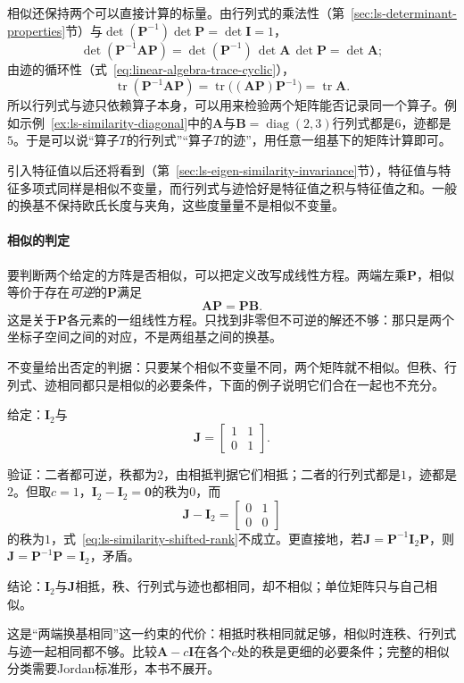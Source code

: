 相似还保持两个可以直接计算的标量。由行列式的乘法性（第~\ref{sec:ls-determinant-properties}节）与$\det(\bm P^{-1})\det\bm P=\det\bm I=1$，
\[
 \det(\bm P^{-1}\bm A\bm P)=\det(\bm P^{-1})\,\det\bm A\,\det\bm P=\det\bm A;
\]
由迹的循环性（式~\eqref{eq:linear-algebra-trace-cyclic}），
\[
 \operatorname{tr}(\bm P^{-1}\bm A\bm P)=\operatorname{tr}\bigl((\bm A\bm P)\bm P^{-1}\bigr)=\operatorname{tr}\bm A.
\]
所以行列式与迹只依赖算子本身，可以用来检验两个矩阵能否记录同一个算子。例如示例~\ref{ex:ls-similarity-diagonal}中的$\bm A$与$\bm B=\operatorname{diag}(2,3)$行列式都是$6$，迹都是$5$。于是可以说“算子$T$的行列式”“算子$T$的迹”，用任意一组基下的矩阵计算即可。

引入特征值以后还将看到（第~\ref{sec:ls-eigen-similarity-invariance}节），特征值与特征多项式同样是相似不变量，而行列式与迹恰好是特征值之积与特征值之和。一般的换基不保持欧氏长度与夹角，这些度量量不是相似不变量。

\paragraph{相似的判定}
\label{sec:ls-similarity-conditions}
要判断两个给定的方阵是否相似，可以把定义改写成线性方程。两端左乘$\bm P$，相似等价于存在\emph{可逆}的$\bm P$满足
\begin{equation}
 \bm A\bm P=\bm P\bm B.
 \label{eq:ls-similarity-equation}
\end{equation}
这是关于$\bm P$各元素的一组线性方程。只找到非零但不可逆的解还不够：那只是两个坐标子空间之间的对应，不是两组基之间的换基。

不变量给出否定的判据：只要某个相似不变量不同，两个矩阵就不相似。但秩、行列式、迹相同都只是相似的必要条件，下面的例子说明它们合在一起也不充分。
\begin{example}[反例：相抵而不相似的两个矩阵]
\label{ex:ls-equivalent-not-similar}
给定：$\bm I_2$与
\[
 \bm J=\begin{bmatrix}1&1\\0&1\end{bmatrix}.
\]

验证：二者都可逆，秩都为$2$，由相抵判据它们相抵；二者的行列式都是$1$，迹都是$2$。但取$c=1$，$\bm I_2-\bm I_2=\bm0$的秩为$0$，而
\[
 \bm J-\bm I_2=\begin{bmatrix}0&1\\0&0\end{bmatrix}
\]
的秩为$1$，式~\eqref{eq:ls-similarity-shifted-rank}不成立。更直接地，若$\bm J=\bm P^{-1}\bm I_2\bm P$，则$\bm J=\bm P^{-1}\bm P=\bm I_2$，矛盾。

结论：$\bm I_2$与$\bm J$相抵，秩、行列式与迹也都相同，却不相似；单位矩阵只与自己相似。
\end{example}
这是“两端换基相同”这一约束的代价：相抵时秩相同就足够，相似时连秩、行列式与迹一起相同都不够。比较$\bm A-c\bm I$在各个$c$处的秩是更细的必要条件；完整的相似分类需要Jordan标准形，本书不展开。

